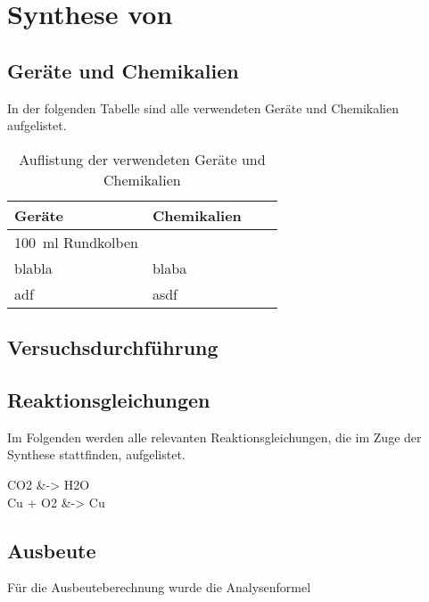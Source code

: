 \pagebreak

\section{Synthese von }

\subsection*{Geräte und Chemikalien}

  In der folgenden Tabelle sind alle verwendeten Geräte und Chemikalien aufgelistet. 
  
  \begin{table}[H]
    \centering
    \caption[Materialien- und Chemikalienliste Synthese von , Quelle: Autor]{Auflistung der verwendeten Geräte und Chemikalien}
    \label{tab:Materialien}
        
    \begin{tabular}{@{}l|lp{4.5cm}l@{}}
      \toprule
      Geräte & Chemikalien \\ \midrule
        \SI[mode=text]{100}{\milli\litre} Rundkolben &  \\
        blabla & blaba \\ 
        adf & asdf \\ \bottomrule
    \end{tabular}
  \end{table}
      
\subsection*{Versuchsdurchführung}

\subsection*{Reaktionsgleichungen}
  
  Im Folgenden werden alle relevanten Reaktionsgleichungen, die im Zuge der Synthese stattfinden, aufgelistet. 
  
  \begin{reactions*}
    CO2 &-> H2O \\
    Cu + O2 &-> Cu
  \end{reactions*}
  
\subsection*{Ausbeute}
  Für die Ausbeuteberechnung wurde die Analysenformel 
  
